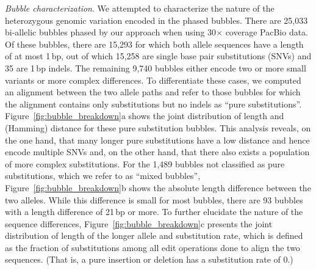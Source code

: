 \textit{Bubble characterization}.
We attempted to characterize the nature of the heterozygous genomic variation encoded in the phased bubbles.
There are 25,033 bi-allelic bubbles phased by our approach when using 30$\times$ coverage PacBio data.
Of these bubbles, there are 15,293 for which both allele sequences have a length of at most 1\,bp, out of which 15,258 are single base pair substitutions (SNVs) and 35 are 1\,bp indels.
The remaining 9,740 bubbles either encode two or more small variants or more complex differences.
To differentiate these cases, we computed an alignment between the two allele paths and refer to those bubbles for which the alignment contains only substitutions but no indels as ``pure substitutions''.
Figure~\ref{fig:bubble_breakdown}a shows the joint distribution of length and (Hamming) distance for these pure substitution bubbles.
This analysis reveals, on the one hand, that many longer pure substitutions have a low distance and hence encode multiple SNVs and, on the other hand, that there also exists a population of more complex substitutions.
For the 1,489 bubbles not classified as pure substitutions, which we refer to as ``mixed bubbles'', Figure~\ref{fig:bubble_breakdown}b shows the absolute length difference between the two alleles.
While this difference is small for most bubbles, there are 93 bubbles with a length difference of 21\,bp or more.
To further elucidate the nature of the sequence differences, Figure~\ref{fig:bubble_breakdown}c presents the joint distribution of length of the longer allele and substitution rate, which is defined as the fraction of substitutions among all edit operations done to align the two sequences. (That is, a pure insertion or deletion has a substitution rate of 0.)


